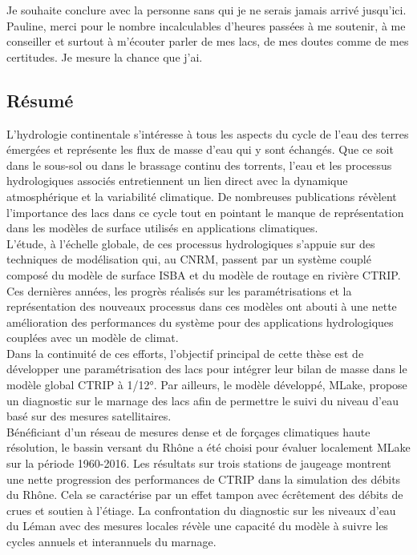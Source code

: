 \documentclass[a4paper,12pt,twoside]{StyleThese}
\begin{document}
\noindent Je souhaite conclure avec la personne sans qui je ne serais jamais arrivé jusqu’ici. Pauline, merci pour le nombre incalculables d’heures passées à me soutenir, à me conseiller et surtout à m’écouter parler de mes lacs, de mes doutes comme de mes certitudes. Je mesure la chance que j’ai.

\cleardoublepage

\begin{vcenterpage}
\chapter*{{\selectfont Résumé}}
\label{chap:résumé}
\noindent L'hydrologie continentale s'intéresse à tous les aspects du cycle de l'eau des terres émergées et représente les flux de masse d'eau qui y sont échangés. Que ce soit dans le sous-sol ou dans le brassage continu des torrents, l'eau et les processus hydrologiques associés entretiennent un lien direct avec la dynamique atmosphérique et la variabilité climatique. De nombreuses publications révèlent l'importance des lacs dans ce cycle tout en pointant le manque de représentation dans les modèles de surface utilisés en applications climatiques.
\\
L'étude, à l'échelle globale, de ces processus hydrologiques s'appuie sur des techniques de modélisation qui, au CNRM, passent par un système couplé composé du modèle de surface ISBA et du modèle de routage en rivière CTRIP. Ces dernières années, les progrès réalisés sur les paramétrisations et la représentation des nouveaux processus dans ces modèles ont abouti à une nette amélioration des performances du système pour des applications hydrologiques couplées avec un modèle de climat.
\\
Dans la continuité de ces efforts, l'objectif principal de cette thèse est de développer une paramétrisation des lacs pour intégrer leur bilan de masse dans le modèle global CTRIP à 1/12°. Par ailleurs, le modèle développé, MLake, propose un diagnostic sur le marnage des lacs afin de permettre le suivi du niveau d'eau basé sur des mesures satellitaires.
\\
Bénéficiant d'un réseau de mesures dense et de forçages climatiques haute résolution, le bassin versant du Rhône a été choisi pour évaluer localement MLake sur la période 1960-2016. Les résultats sur trois stations de jaugeage montrent une nette progression des performances de CTRIP dans la simulation des débits du Rhône. Cela se caractérise par un effet tampon avec écrêtement des débits de crues et soutien à l'étiage. La confrontation du diagnostic sur les niveaux d'eau du Léman avec des mesures locales révèle une capacité du modèle à suivre les cycles annuels et interannuels du marnage.

\end{vcenterpage}
\end{document}
